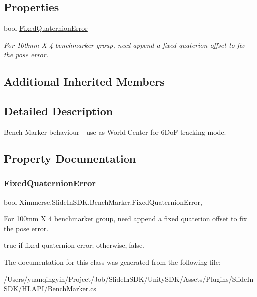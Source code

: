 \subsection*{Properties}
\begin{DoxyCompactItemize}
\item 
bool \mbox{\hyperlink{class_ximmerse_1_1_slide_in_s_d_k_1_1_bench_marker_a46fe7c33539fa684fab1f28047acbd8e}{Fixed\+Quaternion\+Error}}
\begin{DoxyCompactList}\small\item\em For 100mm X 4 benchmarker group, need append a fixed quaterion offset to fix the pose error. \end{DoxyCompactList}\end{DoxyCompactItemize}
\subsection*{Additional Inherited Members}


\subsection{Detailed Description}
Bench Marker behaviour -\/ use as World Center for 6\+DoF tracking mode. 



\subsection{Property Documentation}
\mbox{\label{class_ximmerse_1_1_slide_in_s_d_k_1_1_bench_marker_a46fe7c33539fa684fab1f28047acbd8e}} 
\subsubsection{\texorpdfstring{Fixed\+Quaternion\+Error}{FixedQuaternionError}}
{\footnotesize\ttfamily bool Ximmerse.\+Slide\+In\+S\+D\+K.\+Bench\+Marker.\+Fixed\+Quaternion\+Error\hspace{0.3cm}{\ttfamily [get]}, {\ttfamily [set]}}



For 100mm X 4 benchmarker group, need append a fixed quaterion offset to fix the pose error. 

{\ttfamily true} if fixed quaternion error; otherwise, {\ttfamily false}.

The documentation for this class was generated from the following file\+:\begin{DoxyCompactItemize}
\item 
/\+Users/yuanqingyin/\+Project/\+Job/\+Slide\+In\+S\+D\+K/\+Unity\+S\+D\+K/\+Assets/\+Plugins/\+Slide\+In\+S\+D\+K/\+H\+L\+A\+P\+I/Bench\+Marker.\+cs\end{DoxyCompactItemize}
